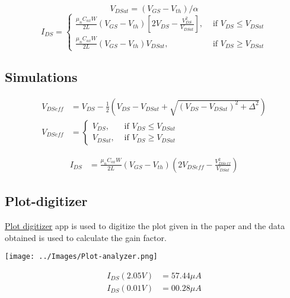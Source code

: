 \documentclass{article}
\begin{document}
\begin{equation}
    V_{DSat} = (V_{GS} - V_{th})/\alpha 
\end{equation}
\begin{equation}
    I_{DS} = \begin{cases}
        \frac{\mu_n C_{ox} W}{2L} (V_{GS}-V_{th}) \left[ 2V_{DS} - \frac{V_{DS}^2}{V_{DSat}}\right], & \text{ if } V_{DS}\leq V_{DSat} \\
        \frac{\mu_n C_{ox} W}{2L} (V_{GS}-V_{th}) V_{DSat}, & \text { if } V_{DS} \geq V_{DSat}
    \end{cases} 
\end{equation}

\subsection{Simulations}

\begin{align}
        V_{DSeff} &= V_{DS} -  \frac{1}{2}(V_{DS}-V_{DSat}+\sqrt{(V_{DS}-V_{DSat})^2 + \Delta^2}) \\
        V_{DSeff} &= \begin{cases}
        V_{DS}, & \text{ if } V_{DS}\leq V_{DSat} \\
        V_{DSat}, & \text { if } V_{DS} \geq V_{DSat}
        \end{cases}
\end{align}

\begin{align} 
    \label{eq:DrainCurrent}
    I_{DS} &= \frac{\mu_n C_{ox} W}{2L}(V_{GS}-V_{th}) \left(2V_{DSeff} - \frac{V_{DSeff}^2}{V_{DSat}}\right)
\end{align}

\newpage

\subsection{Plot-digitizer}
\href{https://plotdigitizer.com/app}{Plot digitizer} app is used to digitize the plot given in the paper and the data obtained is used to calculate the gain factor.  
\begin{center}
        \texttt{[image: ../Images/Plot-analyzer.png]}        
\end{center}
    

\begin{align*}
    I_{DS}(2.05 V) &= 57.44 \mu A \\
    I_{DS}(0.01 V) &= 00.28 \mu A 
\end{align*}
\end{document}

